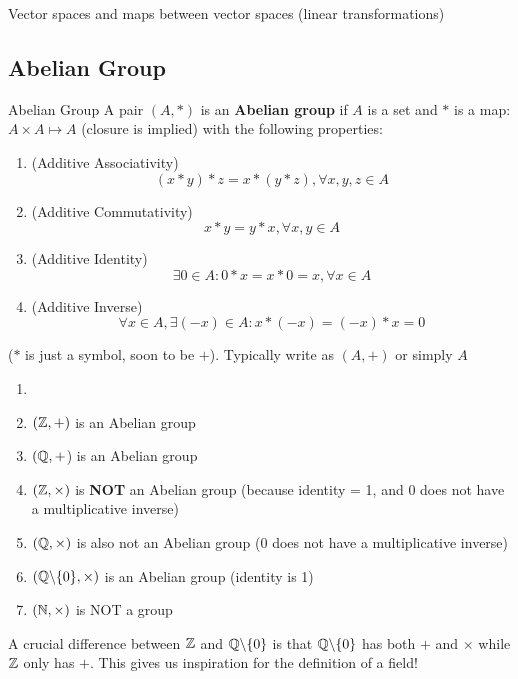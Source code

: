 \begin{goal}
    Vector spaces and maps between vector spaces (linear transformations)
\end{goal}
\subsection{Abelian Group}
\begin{definition} {Abelian Group}
    A pair \((A, *)\) is an \textbf{Abelian group} if \(A\) is a set and \(*\) is a map: \(A \times A \mapsto A\) (closure is implied) with the following properties:
    \begin{enumerate}
        \item (Additive Associativity) \[
                  (x * y) * z = x * (y * z), \forall x, y, z \in A
              \]
        \item (Additive Commutativity) \[
                  x * y = y * x, \forall x, y \in A
              \]
        \item (Additive Identity) \[
                  \exists 0 \in A: 0 * x = x * 0 = x, \forall x \in A
              \]
        \item (Additive Inverse) \[
                  \forall x \in A, \exists (-x) \in A: x * (-x) = (-x) * x = 0
              \]
    \end{enumerate}
\end{definition}

\begin{remark}
    (\(*\) is just a symbol, soon to be \(+\)). Typically write as \((A, +)\) or simply \(A\)
\end{remark}

\begin{example}
    \begin{enumerate}
        \item[]
        \item \((\mathbb{Z}, +)\) is an Abelian group
        \item \((\mathbb{Q}, +\)) is an Abelian group
        \item \((\mathbb{Z}, \times)\) is \textbf{NOT} an Abelian group (because identity = 1, and 0 does not have a multiplicative inverse)
        \item \((\mathbb{Q}, \times)\) is also not an Abelian group (0 does not have a multiplicative inverse)
        \item \((\mathbb{Q}\backslash\{0\}, \times)\) is an Abelian group (identity is 1)
        \item \((\mathbb{N}, \times)\) is NOT a group
    \end{enumerate}
\end{example}
\begin{remark}
    A crucial difference between \(\mathbb{Z}\) and \(\mathbb{Q}\backslash\{0\}\) is that \(\mathbb{Q}\backslash\{0\}\) has both \(+\) and \(\times\) while \(\mathbb{Z}\) only has \(+\). This gives us inspiration for the definition of a field!
\end{remark}

